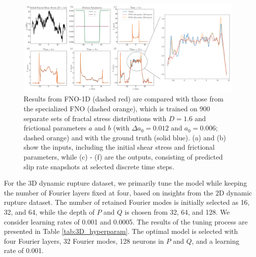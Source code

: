 \documentclass[draft]{agujournal2019}
\begin{document}
\begin{figure}
\centering
\includegraphics[width=1.0\linewidth]{tuninig_set6_R2.png}
\caption{\label{fig:tuning_set6} Results from FNO-1D (dashed red) are compared with those from the specialized FNO (dashed orange), which is trained on 900 separate sets of fractal stress distributions with \(D=1.6\) and frictional parameters \(a\) and \(b\) (with \(\Delta a_{0}=0.012\) and \(a_{0}=0.006\); dashed orange) and with the ground truth (solid blue). (a) and (b) show the inputs, including the initial shear stress and frictional parameters, while (c) - (f) are the outputs, consisting of predicted slip rate snapshots at selected discrete time steps.
}
\end{figure}


For the 3D dynamic rupture dataset, we primarily tune the model while keeping the number of Fourier layers fixed at four, based on insights from the 2D dynamic rupture dataset. The number of retained Fourier modes is initially selected as 16, 32, and 64, while the depth of \(P\) and \(Q\) is chosen from 32, 64, and 128. We consider learning rates of 0.001 and 0.0005. The results of the tuning process are presented in Table \ref{tab:3D_hyperparam}. The optimal model is selected with four Fourier layers, 32 Fourier modes, 128 neurons in \(P\) and \(Q\), and a learning rate of 0.001.
\end{document}
